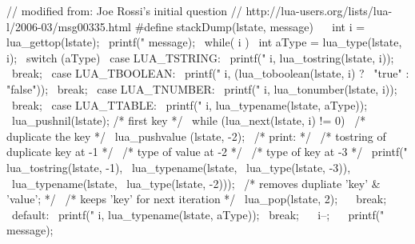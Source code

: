 \startCHeader
// modified from: Joe Rossi's initial question
// http://lua-users.org/lists/lua-l/2006-03/msg00335.html
#define stackDump(lstate, message)                \
  {                                               \
    int i = lua_gettop(lstate);                   \
    printf("%
      message);                                   \
    while( i ) {                                  \
      int aType = lua_type(lstate, i);            \
      switch (aType) {                            \
      case LUA_TSTRING:                           \
        printf("%
          i, lua_tostring(lstate, i));            \
        break;                                    \
      case LUA_TBOOLEAN:                          \
        printf("%
          i, (lua_toboolean(lstate, i) ?          \
            "true" : "false"));                   \
        break;                                    \
      case LUA_TNUMBER:                           \
        printf("%
          i, lua_tonumber(lstate, i));            \
        break;                                    \
      case LUA_TTABLE:                            \
        printf("%
          i, lua_typename(lstate, aType));        \
        lua_pushnil(lstate); /* first key */      \
        while (lua_next(lstate, i) != 0) {        \
          /* duplicate the key */                 \
          lua_pushvalue (lstate, -2);             \
          /* print:                           */  \
          /*  tostring of duplicate key at -1 */  \
          /*  type of value             at -2 */  \
          /*  type of key               at -3 */  \
          printf("   %
              lua_tostring(lstate, -1),           \
              lua_typename(lstate,                \
                lua_type(lstate, -3)),            \
              lua_typename(lstate,                \
                lua_type(lstate, -2)));           \
          /* removes dupliate 'key' & 'value'; */ \
          /* keeps 'key' for next iteration    */ \
          lua_pop(lstate, 2);                     \
        }                                         \
        break;                                    \
      default:                                    \
        printf("%
          i, lua_typename(lstate, aType));        \
        break;                                    \
      }                                           \
      i--;                                        \
    }                                             \
    printf("%
      message);                                   \
  }
\stopCHeader

